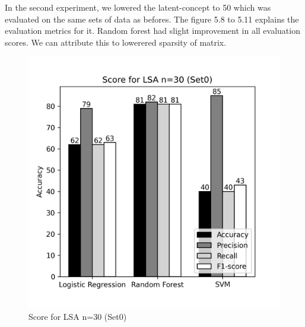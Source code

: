 \documentclass[12pt]{report}
\begin{document}
             In the second experiment, we lowered the latent-concept to 50 which was evaluated on the same sets of data as befores. The figure 5.8 to 5.11 explains the evaluation metrics for it. 
             Random forest had slight improvement in all evaluation scores. We can attribute this to lowerered sparsity of matrix.

             


             \begin{figure}[!htb]
                \begin{minipage}{0.48\textwidth}
                  \centering
                  \includegraphics[scale=0.55]{plots/Score for LSA n=30 (Set0).png}
                  \caption{Score for LSA n=30 (Set0)}\label{Fig:typo1}
                \end{minipage}\hfill
                \begin{minipage}{0.48\textwidth}
                  \centering

\end{minipage}
\end{figure}
\end{document}
